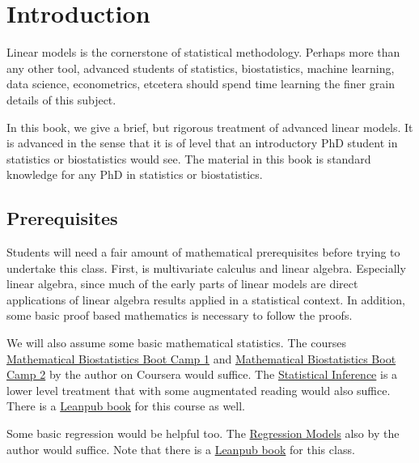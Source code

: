 \chapter{Introduction}


Linear models is the cornerstone of statistical methodology.
Perhaps more than any other tool, advanced students of
statistics, biostatistics, machine learning, data science,
econometrics, etcetera should spend time learning the
finer grain details of this subject.

In this book, we give a brief, but rigorous 
treatment of advanced linear models.
It is advanced in the sense that it is of level that an
introductory PhD student in statistics or biostatistics
would see. The material in this book is standard
knowledge for any PhD in statistics or biostatistics. 

\section{Prerequisites}

Students will need a fair amount of mathematical prerequisites
before trying to undertake this class. First, is multivariate
calculus and linear algebra. Especially linear algebra, since
much of the early parts of linear models are direct applications
of linear algebra results applied in a statistical context.
In addition, some basic proof based mathematics is necessary
to follow the proofs.

We will also assume some basic mathematical statistics. The
courses \href{https://www.coursera.org/course/biostats}{Mathematical Biostatistics Boot Camp 1}
and \href{https://www.coursera.org/course/biostats2}{Mathematical Biostatistics Boot Camp 2}
by the author on Coursera would suffice. The \href{https://www.coursera.org/course/statinference}{Statistical Inference} is a lower level
treatment that with some augmentated reading would also suffice.
There is a \href{https://leanpub.com/LittleInferenceBook}{Leanpub book} for
this course as well.

Some basic regression would
be helpful too. The \href{https://www.coursera.org/course/regmods}{Regression Models}
also by the author would suffice. Note that there is a
\href{https://leanpub.com/regmods/}{Leanpub book} for this class. 
